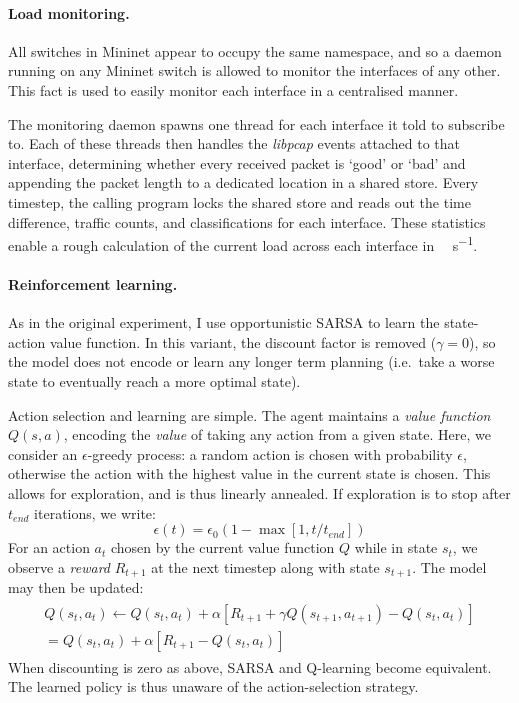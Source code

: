 \documentclass[10pt, a4paper]{article}
\begin{document}
\paragraph{Load monitoring.}
All switches in Mininet appear to occupy the same namespace, and so a daemon running on any Mininet switch is allowed to monitor the interfaces of any other.
This fact is used to easily monitor each interface in a centralised manner.

The monitoring daemon spawns one thread for each interface it told to subscribe to.
Each of these threads then handles the \emph{libpcap} events attached to that interface, determining whether every received packet is `good' or `bad' and appending the packet length to a dedicated location in a shared store.
Every timestep, the calling program locks the shared store and reads out the time difference, traffic counts, and classifications for each interface.
These statistics enable a rough calculation of the current load across each interface in \si{\mega\bit\per\second}.

\paragraph{Reinforcement learning.} As in the original experiment, I use opportunistic SARSA to learn the state-action value function.
In this variant, the discount factor is removed ($\gamma = 0$), so the model does not encode or learn any longer term planning (i.e.\ take a worse state to eventually reach a more optimal state).

Action selection and learning are simple.
The agent maintains a \emph{value function} $Q(s, a)$, encoding the \emph{value} of taking any action from a given state.
Here, we consider an $\epsilon$-greedy process: a random action is chosen with probability $\epsilon$, otherwise the action with the highest value in the current state is chosen.
This allows for exploration, and is thus linearly annealed.
If exploration is to stop after $t_{end}$ iterations, we write:
\begin{equation}
\epsilon(t) = \epsilon_0(1 - \max[1, t/t_{end}])
\end{equation}
For an action $a_t$ chosen by the current value function $Q$ while in state $s_t$, we observe a \emph{reward} $R_{t+1}$ at the next timestep along with state $s_{t+1}$.
The model may then be updated:
\begin{align}
\begin{split}
Q(s_t,a_t) \leftarrow Q(s_t,a_t) + \alpha [R_{t+1} + \gamma Q(s_{t+1},a_{t+1}) - Q(s_t,a_t)] \\
= Q(s_t,a_t) + \alpha [R_{t+1} - Q(s_t,a_t)] 
\end{split}
\end{align}
When discounting is zero as above, SARSA and Q-learning become equivalent.
The learned policy is thus unaware of the action-selection strategy.
\end{document}
